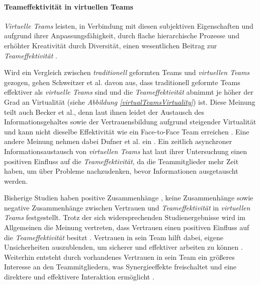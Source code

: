 \documentclass[a4paper,11pt]{article}%
\renewcommand{\\}{\vspace*{0.5\baselineskip} \newline}
\begin{document}
\paragraph{Teameffektivität in virtuellen Teams}
\label{TEinVT}
\textit{Virtuelle Teams} leisten, in Verbindung mit diesen subjektiven Eigenschaften und aufgrund ihrer Anpassungsfähigkeit, durch flache hierarchische Prozesse und erhöhter Kreativität durch Diversität, einen wesentlichen Beitrag zur \textit{Teameffektivität} \citep{handke2019alles} \citep{becker2002fuhrung}.

Wird ein Vergleich zwischen \textit{traditionell} geformten Teams und \textit{virtuellen Teams} gezogen, gehen Schweitzer et al. \citep{schweitzer2010conceptualizing} davon aus, dass traditionell geformte Teams effektiver als \textit{virtuelle Teams} sind und die \textit{Teameffektivität} abnimmt je höher der Grad an Virtualität (siehe \textit{Abbildung \ref{virtualTeamsVirtuality}}) ist.
Diese Meinung teilt auch Becker et al., denn laut ihnen leidet der Austausch des Informationsgehaltes sowie der Vertrauensbildung aufgrund steigender Virtualität und kann nicht dieselbe Effektivität wie ein Face-to-Face Team erreichen \citep{becker2002fuhrung}.
Eine andere Meinung nehmen dabei Dufner et al. ein \citep{dufner2002asynchronous}. Ein zeitlich asynchroner Informationsaustausch von \textit{virtuellen Teams} hat laut ihrer Untersuchung einen positiven Einfluss auf die \textit{Teameffektivität}, da die Teammitglieder mehr Zeit haben, um über Probleme nachzudenken, bevor Informationen ausgetauscht werden.

Bisherige Studien haben positive Zusammenhänge \citep{davis2000trusted}, keine Zusammenhänge \citep{hertel2004managing} sowie negative Zusammenhänge \citep{dirks1999effects} zwischen Vertrauen und \textit{Teameffektivität} in \textit{virtuellen Teams} festgestellt.
Trotz der sich widersprechenden Studienergebnisse wird im Allgemeinen die Meinung vertreten, dass Vertrauen einen positiven Einfluss auf die \textit{Teameffektivität} besitzt \citep{de2016trust}. 
Vertrauen in sein Team hilft dabei, eigene Unsicherheiten auszublenden, um sicherer und effektiver arbeiten zu können \citep{de2010does}. Weiterhin entsteht durch vorhandenes Vertrauen in sein Team ein größeres Interesse an den Teammitgliedern, was Synergieeffekte freischaltet und eine direktere und effektivere Interaktion ermöglicht \citep{dirks1999effects}. 
	
\end{document}
